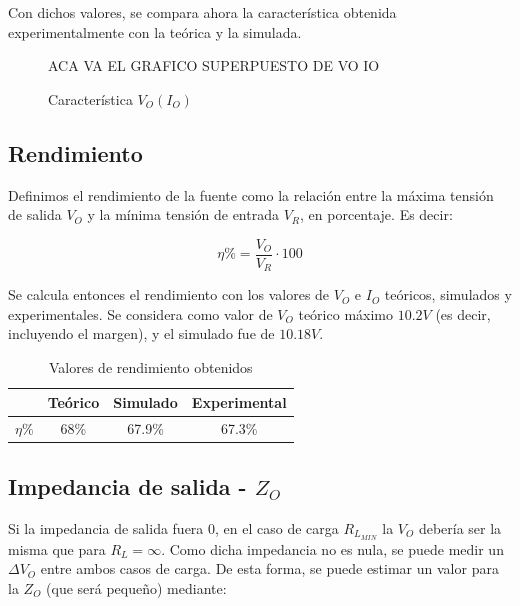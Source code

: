 Con dichos valores, se compara ahora la caracter\'istica obtenida experimentalmente con la te\'orica y la simulada.

\begin{figure}[!h]
\begin{centering}
ACA VA EL GRAFICO SUPERPUESTO DE VO IO
\par\end{centering}
\caption{Caracter\'istica $V_O(I_O)$}

\end{figure}  

\subsection{Rendimiento}

Definimos el rendimiento de la fuente como la relaci\'on entre la m\'axima tensi\'on de salida $V_O$ y la m\'inima tensi\'on de entrada $V_R$, en porcentaje. Es decir:

$$\eta \% = \frac{V_O}{V_R} \cdot 100$$ 

Se calcula entonces el rendimiento con los valores de $V_O$ e $I_O$ te\'oricos, simulados y experimentales. Se considera como valor de $V_O$ te\'orico m\'aximo $10.2V$ (es decir, incluyendo el margen), y el simulado fue de $10.18V$.

\begin{table}[!h]
\begin{center}
\begin{tabular}{|c||c|c|c|}
\hline
& Te\'orico & Simulado & Experimental\\
\hline 
$\eta \%$ & 68\% & 67.9\% & 67.3\%\\
\hline 
\end{tabular}
\end{center}

\caption{Valores de rendimiento obtenidos}
\end{table}

\subsection{Impedancia de salida - $Z_O$}
 
Si la impedancia de salida fuera 0, en el caso de carga $R_{L_{MIN}}$ la $V_O$ deber\'ia ser la misma que para $R_L = \infty $. Como dicha impedancia no es nula, se puede medir un $\Delta V_O$ entre ambos casos de carga. De esta forma, se puede estimar un valor para la $Z_O$ (que ser\'a peque\~no) mediante:

